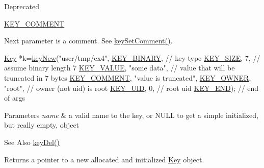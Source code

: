 \begin{DoxyRefDesc}{Deprecated}
\begin{DoxyItemize}
\item \hyperlink{group__key_gga91fb3178848bd682000958089abbaf40ac29427bb47cc31689d02912e36161ee3}{K\-E\-Y\-\_\-\-C\-O\-M\-M\-E\-N\-T} \par
 Next parameter is a comment. See \hyperlink{group__keyvalue_ga8863a877a84fa46e6017fe72e49b89c1}{key\-Set\-Comment()}. 
\begin{DoxyCodeInclude}
\hyperlink{classkdb_1_1Key_a5679f5cae63caddd64a60388b9cc77fa}{Key} *k=\hyperlink{group__key_gad23c65b44bf48d773759e1f9a4d43b89}{keyNew}(\textcolor{stringliteral}{"user/tmp/ex4"},
        \hyperlink{group__key_gga91fb3178848bd682000958089abbaf40a1ca18d4e094ae7487d35ecedda2235ff}{KEY\_BINARY},                   \textcolor{comment}{// key type}
        \hyperlink{group__key_gga91fb3178848bd682000958089abbaf40a6d531b5c41445d19d0452eebdccbfa01}{KEY\_SIZE}, 7,                    \textcolor{comment}{// assume binary length 7}
        \hyperlink{group__key_gga91fb3178848bd682000958089abbaf40ac66e4a49d09212b79f5754ca6db5bd2e}{KEY\_VALUE}, \textcolor{stringliteral}{"some data"},                \textcolor{comment}{// value that will be
       truncated in 7 bytes}
        \hyperlink{group__key_gga91fb3178848bd682000958089abbaf40ac29427bb47cc31689d02912e36161ee3}{KEY\_COMMENT}, \textcolor{stringliteral}{"value is truncated"},
        \hyperlink{group__key_gga91fb3178848bd682000958089abbaf40a77ca60362fa8daca8d5347db4385068b}{KEY\_OWNER}, \textcolor{stringliteral}{"root"},             \textcolor{comment}{// owner (not uid) is root}
        \hyperlink{group__key_gga91fb3178848bd682000958089abbaf40a28f01a87d65f065172f734c9c9446c0e}{KEY\_UID}, 0,                      \textcolor{comment}{// root uid}
        \hyperlink{group__key_gga91fb3178848bd682000958089abbaf40aa8adb6fcb92dec58fb19410eacfdd403}{KEY\_END});                        \textcolor{comment}{// end of args}
\end{DoxyCodeInclude}

\end{DoxyItemize}\end{DoxyRefDesc}



\begin{DoxyParams}{Parameters}
{\em name} & a valid name to the key, or N\-U\-L\-L to get a simple initialized, but really empty, object \\
\hline
\end{DoxyParams}
\begin{DoxySeeAlso}{See Also}
\hyperlink{group__key_ga3df95bbc2494e3e6703ece5639be5bb1}{key\-Del()} 
\end{DoxySeeAlso}
\begin{DoxyReturn}{Returns}
a pointer to a new allocated and initialized \hyperlink{classkdb_1_1Key}{Key} object. 
\end{DoxyReturn}

